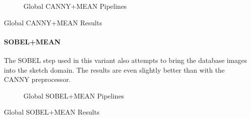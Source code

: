 \begin{figure}[h]
    \centering
    \quad
    \caption[Global CANNY+MEAN Pipelines]{
        Global CANNY+MEAN Pipelines
    }
    \label{fig:pipeline_global_luma_canny_mean}
\end{figure}

\begin{table}[h]
    
    \caption[Global CANNY+MEAN Results]{
        Global CANNY+MEAN Results
    }
    \label{tab:results_global_luma_canny_mean}
\end{table}

\paragraph{SOBEL+MEAN}

The SOBEL step used in this variant also attempts to bring the database images
into the sketch domain. The results are even slightly better than with the
CANNY preprocessor.

\begin{figure}[h]
    \centering
    \quad
    \caption[Global SOBEL+MEAN Pipelines]{
        Global SOBEL+MEAN Pipelines
    }
    \label{fig:pipeline_global_luma_sobel_mean}
\end{figure}

\begin{table}[h]
    
    \caption[Global SOBEL+MEAN Results]{
        Global SOBEL+MEAN Results
    }
    \label{tab:results_global_luma_sobel_mean}
\end{table}
